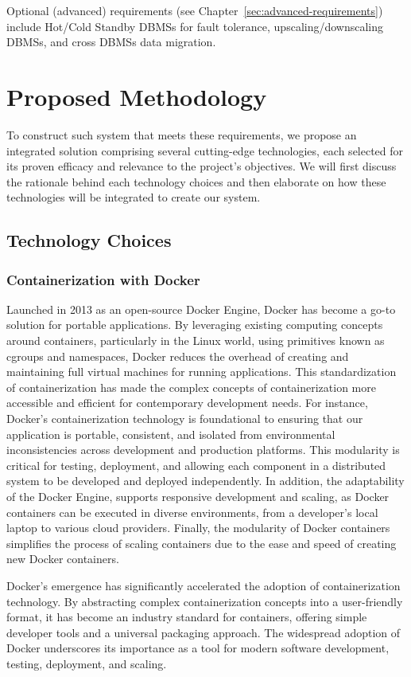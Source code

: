 \documentclass{report}
\begin{document}
    Optional (advanced) requirements (see Chapter~\ref{sec:advanced-requirements}) include Hot/Cold Standby DBMSs for fault tolerance, upscaling/downscaling DBMSs, and cross DBMSs data migration.

    \section{Proposed Methodology}
    To construct such system that meets these requirements, we propose an integrated solution comprising several cutting-edge technologies, each selected for its proven efficacy and relevance to the project's objectives. We will first discuss the rationale behind each technology choices and then elaborate on how these technologies will be integrated to create our system.

    \subsection{Technology Choices}

    \subsubsection{Containerization with Docker}
    Launched in 2013 as an open-source Docker Engine, Docker has become a go-to solution for portable applications. By leveraging existing computing concepts around containers, particularly in the Linux world, using primitives known as cgroups and namespaces, Docker reduces the overhead of creating and maintaining full virtual machines for running applications. This standardization of containerization has made the complex concepts of containerization more accessible and efficient for contemporary development needs. For instance, Docker's containerization technology is foundational to ensuring that our application is portable, consistent, and isolated from environmental inconsistencies across development and production platforms. This modularity is critical for testing, deployment, and allowing each component in a distributed system to be developed and deployed independently. In addition, the adaptability of the Docker Engine, supports responsive development and scaling, as Docker containers can be executed in diverse environments, from a developer's local laptop to various cloud providers. Finally, the modularity of Docker containers simplifies the process of scaling containers due to the ease and speed of creating new Docker containers.

    Docker's emergence has significantly accelerated the adoption of containerization technology. By abstracting complex containerization concepts into a user-friendly format, it has become an industry standard for containers, offering simple developer tools and a universal packaging approach. The widespread adoption of Docker underscores its importance as a tool for modern software development, testing, deployment, and scaling.
\end{document}

